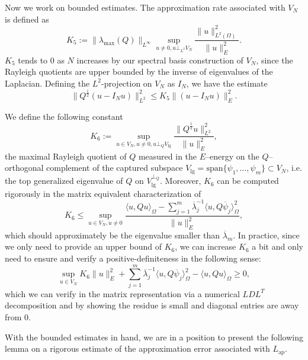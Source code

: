 \documentclass[11pt,a4paper]{article}
\numberwithin{equation}{section}
\newcommand{\assign}{:=}
\newcommand{\tmop}[1]{\ensuremath{\operatorname{#1}}}
\begin{document}
Now we work on bounded estimates.
The approximation rate associated with $V_N$ is defined as \begin{equation*}
  K_5\assign{\| \lambda_{\max} (Q) \|_{L^\infty}}\sup_{u \neq 0, u \bot_{L^2} V_N} \frac{\|
    u \|^2_{L^2(\Omega)}}{\|  u \|^2_{E}}.\end{equation*}$K_5$ tends to $0$ as $N$ increases by our spectral basis construction of $V_N$, since the Rayleigh quotients are upper bounded by the inverse of eigenvalues of the Laplacian. 
    Defining the $L^2$-projection on $V_N$ as $I_N$, we have the estimate \begin{equation}
      \label{k5}\| Q^{\frac{1}{2}} (u - I_N u)
    \|_{L^2}^2\leqslant K_5 \|  (u - I_N u) \|_{{E}}^2.\end{equation}
  
  We define the following constant
  \begin{equation}
  K_6\assign\sup_{u\in V_N, u \neq 0, u \bot_{Q}V_\text{lg}} 
      \frac{\|Q^{\frac{1}{2}}
    u \|^2_{L^2}}{\|  u \|^2_{E}},\label{constant small}
  \end{equation}the maximal Rayleigh quotient of $Q$ measured in the $E$--energy on the $Q$--orthogonal complement of the captured subspace $V_{\mathrm{lg}}=\mathrm{span}\{\psi_1,\dots,\psi_m\}\subset V_N$,
i.e. the top generalized eigenvalue of $Q$ on $V_{\mathrm{lg}}^{\perp_Q}$. 
Moreover,
     $K_6$ can be computed rigorously in the matrix equivalent characterization of $$K_6\leqslant\sup_{u\in V_N, u \neq 0} \frac{\langle u, Q
    u \rangle_{\Omega}-\sum_{j = 1}^m \overline\lambda_j^{-1} \langle u, Q\overline\psi_j \rangle_{\Omega} ^2}{\|  u \|^2_{E}},$$
which should approximately be the eigenvalue smaller than $\overline\lambda_m$. In practice, since we only need to provide an upper bound of $K_6$, we can increase $K_6$ a bit and only need to ensure and verify a positive-definiteness in the following sense: 
\begin{equation}
    \label{k6real} \sup_{u\in V_N} K_6\|  u \|^2_{E}+\sum_{j = 1}^m \overline\lambda_j^{-1} \langle u, Q\overline\psi_j \rangle_{\Omega} ^2-\langle u, Q
    u \rangle_{\Omega}\geq0,
\end{equation}
which we can verify in the matrix representation via a numerical $LDL^T$ decomposition and by showing the residue is small and diagonal entries are away from $0$.

With the bounded estimates in hand, we are in a position to present
the following lemma on a rigorous estimate of the approximation error
associated with $L_{\tmop{ap}}$.
\end{document}
